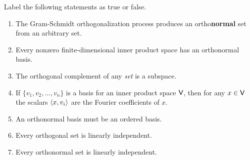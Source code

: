 \exercisesection

\begin{exercise} \label{exercise 6.2.1}
Label the following statements as true or false.
\begin{enumerate}
\item The Gram-Schmidt orthogonalization process produces an ortho\textbf{normal} set from an arbitrary \emph{\LID{}} set.
\item Every nonzero finite-dimensional inner product space has an orthonormal basis.
\item The orthogonal complement of any \emph{set} is a subspace.
\item If \(\{ v_1, v_2, ..., v_n \}\) is a basis for an inner product space \(\textsf{V}\), then for any \(x \in \textsf{V}\) the scalars \(\left< x, v_i \right>\) are the Fourier coefficients of \(x\).
\item An orthonormal basis must be an ordered basis.
\item Every orthogonal set is linearly independent.
\item Every orthonormal set is linearly independent.
\end{enumerate}
\end{exercise}

